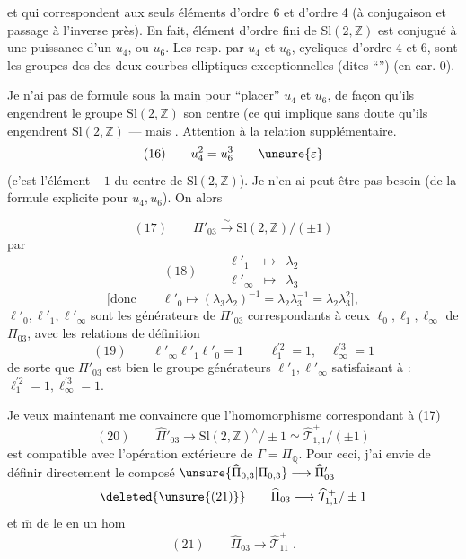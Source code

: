 
et qui correspondent aux seuls éléments d'ordre 6 et d'ordre 4 (à conjugaison et passage à l'inverse près). En fait,  élément d'ordre fini de $\mathrm{Sl}(2,\mathbb Z)$ est conjugué à une puissance d'un $u_4$, ou $u_6$. Les   resp. par $u_4$ et $u_6$, cycliques d'ordre 4 et 6, sont les groupes des  des deux courbes elliptiques exceptionnelles (dites ``'') (en car. 0).

 Je n'ai pas de formule sous la main pour ``placer''  $u_4$ et $u_6$, de façon qu'ils engendrent le groupe $\mathrm{Sl}(2,\mathbb Z)$  son centre (ce qui implique sans doute qu'ils engendrent $\mathrm{Sl}(2,\mathbb Z)$ --- mais . Attention à la relation supplémentaire. 
\[
(16)\qquad u_4^2=u_6^3\qquad\unsure{\varepsilon}
\]
(c'est   l'élément $-1$ du centre de $\mathrm{Sl}(2,\mathbb Z)$). Je n'en ai peut-être pas besoin (de la formule explicite pour $u_4,u_6$). On  alors


\[
(17)\qquad \Pi'_{03}\xrightarrow{\sim}\mathrm{Sl}(2,\mathbb Z)/(\pm1)
\]
par
\[
(18)\qquad
\begin{array}{rcl}
\ell'_1&\longmapsto&\lambda_2\\
\ell'_\infty&\longmapsto&\lambda_3
\end{array}
\]
\[
\bigl[\text{donc}\qquad\ell'_0\longmapsto(\lambda_3\lambda_2)^{-1}
=\lambda_2\lambda_3^{-1}=\lambda_2\lambda_3^2\bigr],
\]
 $\ell'_0,\ell'_1,\ell'_\infty$ sont les générateurs de $\Pi'_{03}$ correspondants à ceux $\ell_0,\ell_1,\ell_\infty$ de $\Pi_{03}$, avec les relations de définition
\[
(19)\qquad\ell'_\infty\ell'_1\ell'_0=1\qquad
\ell_1^{\prime 2}=1,\quad\ell_\infty^{\prime 3}=1
\]
de sorte que $\Pi'_{03}$ est bien le groupe   générateurs $\ell'_1,\ell'_\infty$ satisfaisant à : $\ell_1^{\prime 2}=1,\ell_\infty^{\prime 3}=1$.

Je veux maintenant me convaincre que l'homomorphisme correspondant à (17)
\[
(20)\qquad\widehat{\Pi}'_{03}\longrightarrow
\mathrm{Sl}(2,\mathbb Z)^\wedge/\pm1\simeq
\widehat{\mathcal T}_{1,1}^{+}/(\pm1)
\]
est compatible avec l'opération extérieure de $\Gamma=\Pi_{\mathbb Q}$. Pour ceci, j'ai envie de définir directement le composé  $\unsure{\widehat{\Pi}_{0,3}|\Pi_{0,3}}\longrightarrow\widehat{\Pi}'_{03}$
\[
\text{\deleted{\unsure{(21)}}}\qquad\widehat{\Pi}_{03}\longrightarrow\widehat{\mathcal T}_{1,1}^{+}/\pm1
\]
et $\overline{\mathrm m}$ de le  en un hom
\[
(21)\qquad\widehat{\Pi}_{03}\longrightarrow\widehat{\mathcal T}_{11}^{+}\;.
\]

